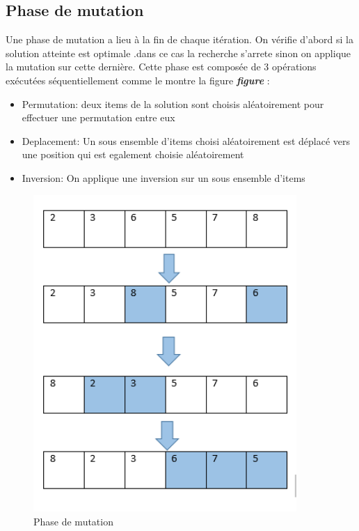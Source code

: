 \documentclass[12pt]{article}
\begin{document}
\subsection{Phase de mutation}
Une phase de mutation a lieu à la fin de chaque itération. On vérifie d'abord si la solution atteinte est optimale .dans ce cas la recherche s'arrete sinon on applique la mutation sur cette dernière.
Cette phase est composée de 3 opérations exécutées séquentiellement comme le montre la figure \textbf{\emph{figure }}: 
\begin{itemize}
    \item Permutation: deux items de la solution sont choisis aléatoirement pour effectuer une permutation entre eux
    \item Deplacement: Un sous ensemble d'items choisi aléatoirement est déplacé vers une position qui est egalement choisie aléatoirement
    \item Inversion: On applique une inversion sur un sous ensemble d'items
\end{itemize}
\begin{figure}[h!]
   \centering
    \includegraphics[width=10cm]{../figures/Mutation.PNG}
    \caption[\small]{Phase de mutation}
    \label{fig:mutation}
\end{figure}
\end{document}
